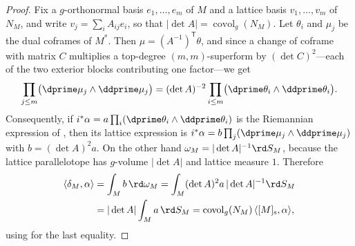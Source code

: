 \begin{proof}
Fix a $g$-orthonormal basis $e_1,\ldots,e_m$ of $M$ and a lattice basis
$v_1,\ldots,v_m$ of $N_M$, and write $v_j=\sum_iA_{ij}e_i$, so that
$|\det A|=\operatorname{covol}_g(N_M)$.  Let $\theta_i$ and $\mu_j$ be the
dual coframes of $M^*$.  Then $\mu=(A^{-1})^{\mathsf T}\theta$, and since a
change of coframe with matrix $C$ multiplies a top-degree $(m,m)$-superform
by $(\det C)^2$---each of the two exterior blocks contributing one
factor---we get
\[
 \prod_{j\le m}\bigl(\dprime\mu_j\wedge\ddprime\mu_j\bigr)
 =(\det A)^{-2}\prod_{i\le m}
   \bigl(\dprime\theta_i\wedge\ddprime\theta_i\bigr).
\]
Consequently, if $i^*\alpha=a\prod_i(\dprime\theta_i\wedge\ddprime\theta_i)$
is the Riemannian expression of , then its
lattice expression is
$i^*\alpha=b\prod_j(\dprime\mu_j\wedge\ddprime\mu_j)$ with
$b=(\det A)^{2}a$.  On the other hand
$\omega_M=|\det A|^{-1}\rd S_M$, because the lattice parallelotope has
$g$-volume $|\det A|$ and lattice measure $1$.  Therefore
\[
 \begin{aligned}
 \langle\delta_M,\alpha\rangle
 &=\int_Mb\,\rd\omega_M
   =\int_M(\det A)^2a\,|\det A|^{-1}\rd S_M\\
 &=|\det A|\int_Ma\,\rd S_M
   =\operatorname{covol}_g(N_M)\,\langle[M]_{\mathrm s},\alpha\rangle,
 \end{aligned}
\]
using  for the last equality.
\end{proof}

